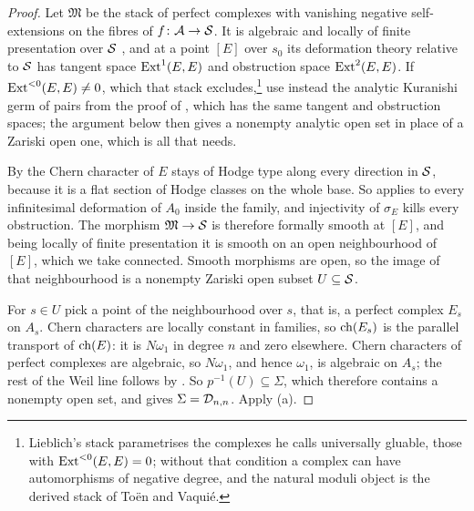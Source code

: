 \begin{proof}
Let $\mathfrak{M}$ be the stack of perfect complexes with vanishing negative
self-extensions on the fibres of $f\colon\mathcal{A}\to\mathcal{S}$. It is algebraic and
locally of finite presentation over $\mathcal{S}$ \cite{Lie06}, and at a point $[E]$
over $s_{0}$ its deformation theory relative to $\mathcal{S}$ has tangent space
$\operatorname{Ext}^{1}(E,E)$ and obstruction space $\operatorname{Ext}^{2}(E,E)$. If
$\operatorname{Ext}^{<0}(E,E)\ne0$, which that stack excludes,\footnote{Lieblich's
stack parametrises the complexes he calls universally gluable, those with
$\operatorname{Ext}^{<0}(E,E)=0$; without that condition a complex can have automorphisms
of negative degree, and the natural moduli object is the derived stack of
To\"en and Vaqui\'e.} use instead the analytic Kuranishi germ of pairs from
the proof of , which has the same tangent and obstruction
spaces; the argument below then gives a nonempty analytic open set in place of
a Zariski open one, which is all that  needs.

By  the Chern character of $E$ stays of Hodge type along
every direction in $\mathcal{S}$, because it is a flat section of Hodge classes on the
whole base. So  applies to every infinitesimal deformation of
$A_{0}$ inside the family, and injectivity of $\sigma_{E}$ kills every
obstruction. The morphism $\mathfrak{M}\to\mathcal{S}$ is therefore formally smooth at
$[E]$, and being locally of finite presentation it is smooth on an open
neighbourhood of $[E]$, which we take connected. Smooth morphisms are open,
so the image of that neighbourhood is a nonempty Zariski open subset
$U\subseteq\mathcal{S}$.

For $s\in U$ pick a point of the neighbourhood over $s$, that is, a perfect
complex $E_{s}$ on $A_{s}$. Chern characters are locally constant in
families, so $\operatorname{ch}(E_{s})$ is the parallel transport of $\operatorname{ch}(E)$: it is
$N\omega_{1}$ in degree $n$ and zero elsewhere. Chern characters of perfect
complexes are algebraic, so $N\omega_{1}$, and hence $\omega_{1}$, is
algebraic on $A_{s}$; the rest of the Weil line follows by
. So $p^{-1}(U)\subseteq\Sigma$, which therefore
contains a nonempty open set, and  gives
$\Sigma=\mathcal{D}_{n,n}$. Apply (a).
\end{proof}

